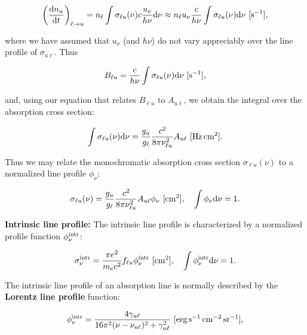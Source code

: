 \documentclass[a4paper,10pt]{article}
\begin{document}
\begin{align*}
    \left(\frac{{\rm d}n_u}{{\rm d}t}\right)_{\ell\rightarrow u}= n_\ell \int \sigma_{\ell u}(\nu)c \frac{u_\nu}{h\nu}{\rm d}\nu \approx n_\ell u_\nu \frac{c}{h\nu} \int \sigma_{\ell u}(\nu){\rm d}\nu ~ [{\rm s^{-1}}],
\end{align*}

{\noindent}where we have assumed that $u_\nu$ (and $h\nu$) do not vary appreciably over the line profile of $\sigma_{u\ell}$. Thus

\begin{align*}
    B_{\ell u} = \frac{c}{h\nu} \int \sigma_{\ell u}(\nu){\rm d}\nu ~ [{\rm s^{-1}}],
\end{align*}

{\noindent}and, using our equation that relates $B_{\ell u}$ to $A_{u\ell}$, we obtain the integral over the absorption cross section:

\begin{align*}
    \int \sigma_{\ell u}(\nu){\rm d}\nu = \frac{g_u}{g_\ell} \frac{c^2}{8\pi\nu_{\ell u}^2}A_{u\ell} ~ [{\rm Hz\,cm^2}].
\end{align*}

{\noindent}Thus we may relate the monochromatic absorption cross section $\sigma_{\ell u}(\nu)$ to a normalized line profile $\phi_\nu$:

\begin{align*}
    \sigma_{\ell u}(\nu) = \frac{g_u}{g_\ell} \frac{c^2}{8\pi\nu_{\ell u}^2}A_{u\ell} \phi_\nu ~ [{\rm cm^2}], ~~~ \int\phi_\nu{\rm d}\nu =1.
\end{align*}

{\noindent}\textbf{Intrinsic line profile:} The intrinsic line profile is characterized by a normalized profile function $\phi_\nu^{\rm intr}$:

\begin{align*}
    \sigma_\nu^{\rm intr} = \frac{\pi e^2}{m_ec^2}f_{\ell u} \phi_\nu^{\rm intr} ~ [{\rm cm^2}], ~~~ \int\phi_\nu^{\rm intr}{\rm d}\nu =1.
\end{align*}

{\noindent}The intrinsic line profile of an absorption line is normally described by the \textbf{Lorentz line profile} function:

\begin{align*}
    \phi_\nu^{\rm intr} = \frac{4\gamma_{u\ell}}{16\pi^2(\nu-\nu_{u\ell})^2+\gamma_{u\ell}^2} ~ [{\rm erg\,s^{-1}\,cm^{-2}\,sr^{-1}}],
\end{align*}
\end{document}
